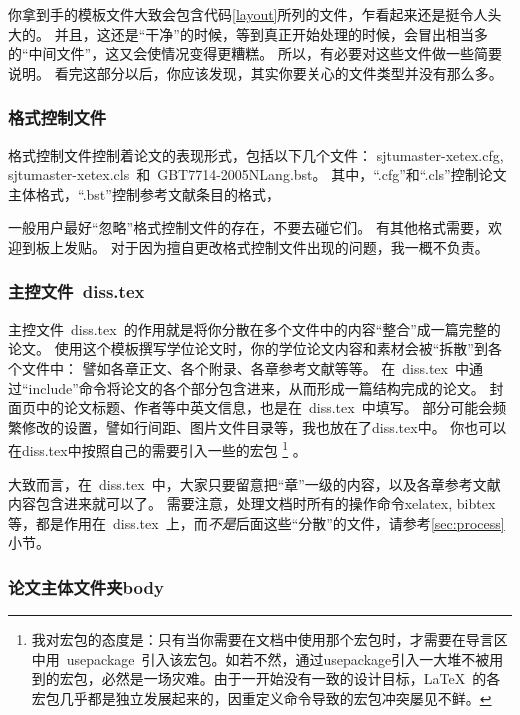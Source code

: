你拿到手的模板文件大致会包含代码\ref{layout}所列的文件，乍看起来还是挺令人头大的。
并且，这还是“干净”的时候，等到真正开始处理的时候，会冒出相当多的“中间文件”，这又会使情况变得更糟糕。
所以，有必要对这些文件做一些简要说明。
看完这部分以后，你应该发现，其实你要关心的文件类型并没有那么多。

\subsubsection{格式控制文件}
\label{sec:format}

格式控制文件控制着论文的表现形式，包括以下几个文件：
sjtumaster-xetex.cfg, sjtumaster-xetex.cls~和~GBT7714-2005NLang.bst。
其中，``.cfg''和``.cls''控制论文主体格式，``.bst''控制参考文献条目的格式，

一般用户最好``忽略''格式控制文件的存在，不要去碰它们。
有其他格式需要，欢迎到板上发贴。
对于因为擅自更改格式控制文件出现的问题，我一概不负责。{\large\smiley}

\subsubsection{主控文件~diss.tex}
\label{sec:disstex}

主控文件~diss.tex~的作用就是将你分散在多个文件中的内容``整合''成一篇完整的论文。
使用这个模板撰写学位论文时，你的学位论文内容和素材会被``拆散''到各个文件中：
譬如各章正文、各个附录、各章参考文献等等。
在~diss.tex~中通过``include''命令将论文的各个部分包含进来，从而形成一篇结构完成的论文。
封面页中的论文标题、作者等中英文信息，也是在~diss.tex~中填写。
部分可能会频繁修改的设置，譬如行间距、图片文件目录等，我也放在了diss.tex中。
你也可以在diss.tex中按照自己的需要引入一些的宏包
\footnote{我对宏包的态度是：只有当你需要在文档中使用那个宏包时，才需要在导言区中用~usepackage~引入该宏包。如若不然，通过usepackage引入一大堆不被用到的宏包，必然是一场灾难。由于一开始没有一致的设计目标，\LaTeX~的各宏包几乎都是独立发展起来的，因重定义命令导致的宏包冲突屡见不鲜。}
。

大致而言，在~diss.tex~中，大家只要留意把``章''一级的内容，以及各章参考文献内容包含进来就可以了。
需要注意，处理文档时所有的操作命令{}\cndash{}xelatex, bibtex等，都是作用在~diss.tex~上，而\emph{不是}后面这些``分散''的文件，请参考\ref{sec:process}小节。

\subsubsection{论文主体文件夹body}
\label{sec:thesisbody}

